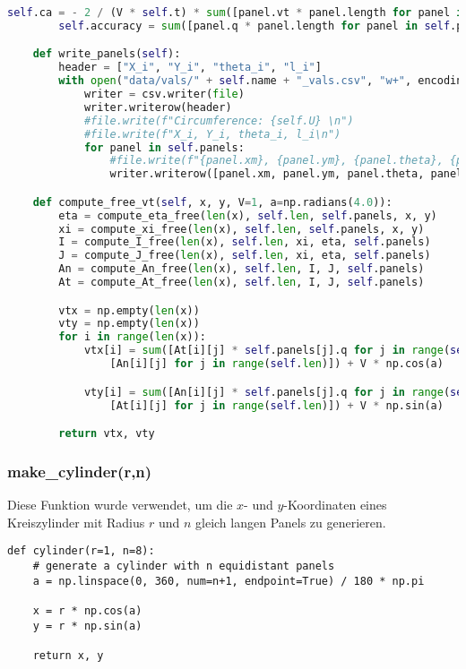 \begin{lstlisting}[language=Python]
        self.ca = - 2 / (V * self.t) * sum([panel.vt * panel.length for panel in self.panels])
        self.accuracy = sum([panel.q * panel.length for panel in self.panels])

    def write_panels(self):
        header = ["X_i", "Y_i", "theta_i", "l_i"]
        with open("data/vals/" + self.name + "_vals.csv", "w+", encoding='UTF8',newline="") as file:
            writer = csv.writer(file)
            writer.writerow(header)
            #file.write(f"Circumference: {self.U} \n")
            #file.write(f"X_i, Y_i, theta_i, l_i\n")
            for panel in self.panels:
                #file.write(f"{panel.xm}, {panel.ym}, {panel.theta}, {panel.length}\n")
                writer.writerow([panel.xm, panel.ym, panel.theta, panel.length])

    def compute_free_vt(self, x, y, V=1, a=np.radians(4.0)):
        eta = compute_eta_free(len(x), self.len, self.panels, x, y)
        xi = compute_xi_free(len(x), self.len, self.panels, x, y)
        I = compute_I_free(len(x), self.len, xi, eta, self.panels)
        J = compute_J_free(len(x), self.len, xi, eta, self.panels)
        An = compute_An_free(len(x), self.len, I, J, self.panels)
        At = compute_At_free(len(x), self.len, I, J, self.panels)

        vtx = np.empty(len(x))
        vty = np.empty(len(x))
        for i in range(len(x)):
            vtx[i] = sum([At[i][j] * self.panels[j].q for j in range(self.len)]) - self.gamma * sum(
                [An[i][j] for j in range(self.len)]) + V * np.cos(a)

            vty[i] = sum([An[i][j] * self.panels[j].q for j in range(self.len)]) + self.gamma * sum(
                [At[i][j] for j in range(self.len)]) + V * np.sin(a)

        return vtx, vty
\end{lstlisting}

\subsubsection{make\_cylinder(r,n)}
Diese Funktion wurde verwendet, um die $x$- und $y$-Koordinaten eines Kreiszylinder mit Radius $r$ und $n$ gleich langen Panels zu generieren.
\begin{lstlisting}
def cylinder(r=1, n=8):
    # generate a cylinder with n equidistant panels
    a = np.linspace(0, 360, num=n+1, endpoint=True) / 180 * np.pi

    x = r * np.cos(a)
    y = r * np.sin(a)

    return x, y
\end{lstlisting}




